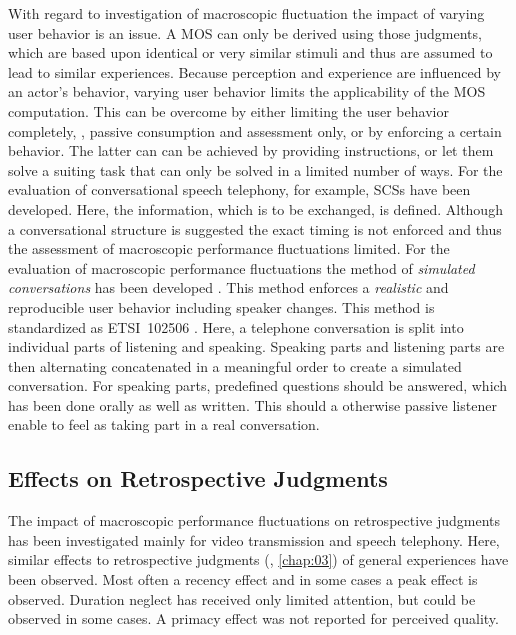 With regard to investigation of macroscopic fluctuation the impact of varying user behavior is an issue.
A \ac{MOS} can only be derived using those judgments, which are based upon identical or very similar stimuli and thus are assumed to lead to similar experiences.
Because perception and experience are influenced by an actor's behavior, varying user behavior limits the applicability of the \ac{MOS} computation.
This can be overcome by either limiting the user behavior completely, \ie, passive consumption and assessment only, or by enforcing a certain behavior.
The latter can can be achieved by providing instructions, or let them solve a suiting task that can only be solved in a limited number of ways.
For the evaluation of conversational speech telephony, for example, \acp{SCS} have been developed.
Here, the information, which is to be exchanged, is defined.
Although a conversational structure is suggested the exact timing is not enforced and thus the assessment of macroscopic performance fluctuations limited.
For the evaluation of macroscopic performance fluctuations the method of \emph{simulated conversations} has been developed \citep{weiss_modeling_2009, berger_estimation_2008}.
This method enforces a \emph{realistic} and reproducible user behavior including speaker changes.
This method is standardized as ETSI~102506 \citep{etsi_speech_2011}.
Here, a telephone conversation is split into individual parts of listening and speaking.
Speaking parts and listening parts are then alternating concatenated in a meaningful order to create a simulated conversation.
For speaking parts, predefined questions should be answered, which has been done orally as well as written.
This should a otherwise passive listener enable to feel as taking part in a real conversation.

\subsection{Effects on Retrospective Judgments}
The impact of macroscopic performance fluctuations on retrospective judgments has been investigated mainly for video transmission and speech telephony.
Here, similar effects to retrospective judgments (\cf, \autoref{chap:03}) of general experiences have been observed.
Most often a recency effect and in some cases a peak effect is observed.
Duration neglect has received only limited attention, but could be observed in some cases.
A primacy effect was not reported for perceived quality.

